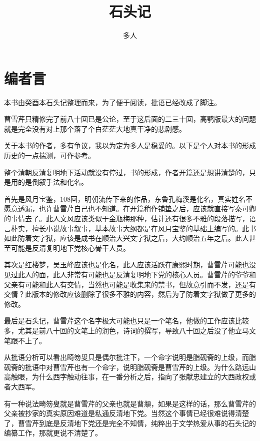 \documentclass[12pt,oneside]{book}
\title{石头记}
\author{多人}
\begin{document}



\frontmatter 
{}
\chapter*{编者言}
本书由癸酉本石头记整理而来，为了便于阅读，批语已经改成了脚注。

曹雪芹只精修完了前八十回已是公论，至于这后面的二三十回，高鹗版最大的问题就是完全没有对上那个落了个白茫茫大地真干净的悲剧感。

关于本书的作者，多有争议，我以为定为多人是稳妥的。以下是个人对本书的形成历史的一点揣测，可作参考。

整个清朝反清复明地下活动就没有停过，书的形成，作者开篇还是想讲清楚的，只是用的是倒叙手法和化名。

首先是风月宝鉴，108回，明朝流传下来的作品，东鲁孔梅溪是化名，真实姓名不愿意透漏，也许曹雪芹自己也不知道。在开篇稍作铺垫之后，应该就直接写秦可卿的事情去了。此人文风应该类似于金瓶梅那种，估计还有很多不雅的段落描写，语言朴实，擅长小说故事叙事，基本故事大纲都是在风月宝鉴的基础上编写的。此书如此防着文字狱，应该是成书在顺治大兴文字狱之后，大约顺治五年之后。此人甚至可能是反清复明地下党核心骨干人员。

其次是红楼梦，吴玉峰应该也是化名，此人应该活跃在康熙时期，曹雪芹可能也没见过此人的面，此人非常有可能也是反清复明地下党的核心人员。曹雪芹的爷爷和父亲有可能和此人有交情，当然也可能是收集来的禁书，但故意引而不发，还是有交情？此版本的修改应该删除了很多不雅的内容，然后为了防着文字狱做了更多的修改。

最后是石头记，曹雪芹这个名字极大可能也只是一个笔名，他做的工作应该比较多，尤其是前八十回的文笔上的润色，诗词的撰写，导致八十回之后没了他立马文笔跟不上了。

从批语分析可以看出畸笏叟只是偶尔批注下，一个命字说明是脂砚斋的上级，而脂砚斋的批语中对曹雪芹也有一个命字，说明脂砚斋是曹雪芹的上级。为什么路远山高触眼，为什么西字触动往事，在一番分析之后，指向了张献忠建立的大西政权或者大西军。

有一种说法畸笏叟就是曹雪芹的父亲也就是曹頫，如果是这样的话，那么曹雪芹的父亲被抄家的真实原因难道是私通反清地下党。当然这个事情已经很难说得清楚了，曹雪芹到底是反清地下党还是完全不知情，纯粹出于文学热爱从事的石头记的编纂工作，那就更说不清楚了。
\end{document}
